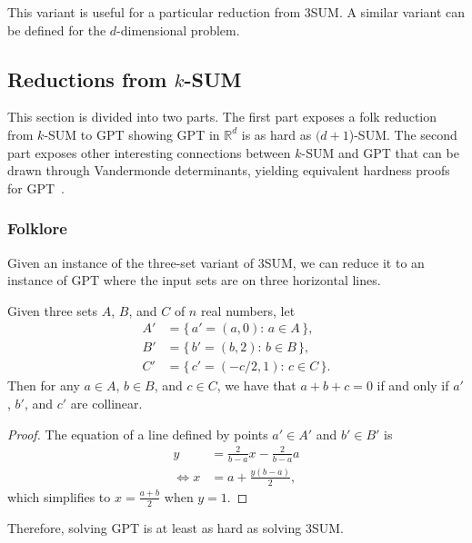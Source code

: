 This variant is useful for a particular reduction from 3SUM.
A similar variant can be defined for the \(d\)-dimensional problem.

\subsection{Reductions from \(k\)-SUM}%
\label{sec:problem:pol:reductions-from-ksum}

This section is divided into two parts.
%
The first part exposes a folk reduction from \(k\)-SUM to GPT showing
GPT in \(\mathbb{R}^d\) is as hard as \((d+1\))-SUM.
%
The second part exposes other interesting connections between \(k\)-SUM and GPT
that can be drawn through Vandermonde determinants, yielding equivalent
hardness proofs for GPT~\cite{Er99b}.


\subsubsection{Folklore}

Given an instance of the three-set variant of 3SUM,
we can reduce it to an instance of GPT where the input sets are on three
horizontal lines.
%
\begin{observation}[label=obs:3sum-to-gpt]
Given three sets \(A\), \(B\), and \(C\) of \(n\) real numbers, let
\begin{align*}
    A' &= \{\, a' = (a,0) \colon\, a \in A\,\},\\
    B' &= \{\, b' = (b,2) \colon\, b \in B\,\},\\
    C' &= \{\, c' = (-c/2,1) \colon\, c \in C\,\}.
\end{align*}
Then for any \(a \in A\), \(b \in B\), and \(c \in C\), we have that
\(a+b+c=0\) if and only if \(a'\), \(b'\), and \(c'\) are collinear.
\end{observation}
%
\begin{proof}
    The equation of a line defined by points \(a' \in A'\) and \(b' \in B'\)
    is
    \begin{align*}
	y &= \frac{2}{b-a} x - \frac{2}{b-a} a\\
	\iff x &= a + \frac{y (b-a)}{2},
    \end{align*}
    which simplifies to \(x = \frac{a+b}{2}\) when \(y = 1\).
\end{proof}

Therefore, solving GPT is at least as hard as solving 3SUM.

